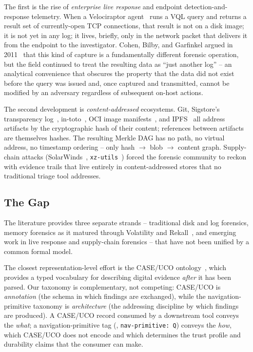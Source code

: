 The first is the rise of \emph{enterprise live response} and endpoint
detection-and-response telemetry. When a Velociraptor agent~\cite{velociraptor}
runs a VQL query and returns a result set of currently-open TCP connections,
that result is not on a disk image; it is not yet in any log; it lives,
briefly, only in the network packet that delivers it from the endpoint to
the investigator. Cohen, Bilby, and Garfinkel argued in
2011~\cite{cohen2011distributed} that this kind of capture is a fundamentally
different forensic operation, but the field continued to treat the resulting
data as ``just another log'' -- an analytical convenience that obscures the
property that the data did not exist before the query was issued and, once
captured and transmitted, cannot be modified by an adversary regardless of
subsequent on-host actions.

The second development is \emph{content-addressed} ecosystems. Git,
Sigstore's transparency log~\cite{newman2022sigstore}, in-toto~\cite{torresarias2019intoto},
OCI image manifests~\cite{ociimagespec}, and IPFS~\cite{benet2014ipfs} all
address artifacts by the cryptographic hash of their content; references between
artifacts are themselves hashes. The resulting Merkle DAG has no path, no virtual
address, no timestamp ordering -- only hash $\to$ blob $\to$ content graph.
Supply-chain attacks (SolarWinds~\cite{cisa2021solarwinds},
\texttt{xz-utils}~\cite{cve2024xz}) forced the forensic community to reckon
with evidence trails that live entirely in content-addressed stores that no
traditional triage tool addresses.

\subsection{The Gap}

The literature provides three separate strands -- traditional disk and log
forensics, memory forensics as it matured through Volatility and
Rekall~\cite{ligh2014artmemory,case2017memory}, and emerging work in live
response and supply-chain forensics -- that have not been unified by a
common formal model.

The closest representation-level effort is the CASE/UCO
ontology~\cite{caseuco2018,casey2017advancing}, which provides a typed
vocabulary for describing digital evidence \emph{after} it has been parsed.
Our taxonomy is complementary, not competing: CASE/UCO is \emph{annotation}
(the schema in which findings are exchanged), while the navigation-primitive
taxonomy is \emph{architecture} (the addressing discipline by which findings
are produced). A CASE/UCO record consumed by a downstream tool conveys the
\emph{what}; a navigation-primitive tag (\eg{}, \texttt{nav-primitive: Q})
conveys the \emph{how}, which CASE/UCO does not encode and which determines
the trust profile and durability claims that the consumer can make.

